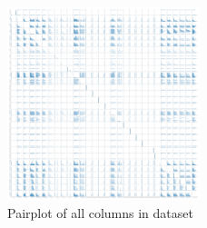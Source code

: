 
\begin{figure}
\includegraphics[width=0.5\textwidth]{img/pairplot.png}
\caption{Pairplot of all columns in dataset}
\label{fig}
\end{figure}